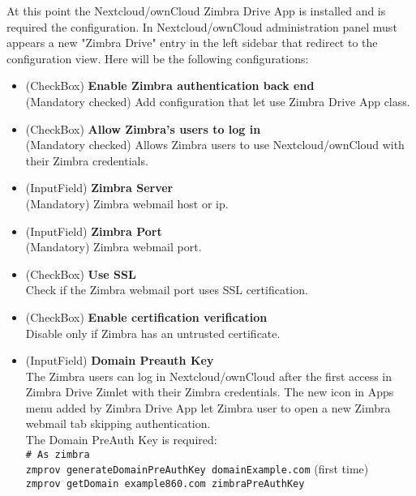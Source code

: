     At this point the Nextcloud/ownCloud Zimbra Drive App is installed and is required the configuration.
    In Nextcloud/ownCloud administration panel must appears a new "Zimbra Drive" entry in the left sidebar
    that redirect to the configuration view. Here will be the following configurations:
    \begin{itemize}
        \item (CheckBox) \textbf{Enable Zimbra authentication back end}\\
        (Mandatory checked) Add configuration that let use Zimbra Drive App class.
        \item (CheckBox) \textbf{Allow Zimbra's users to log in}\\
        (Mandatory checked) Allows Zimbra users to use Nextcloud/ownCloud with their Zimbra credentials.
        \item (InputField) \textbf{Zimbra Server}\\
        (Mandatory) Zimbra webmail host or ip.
        \item (InputField) \textbf{Zimbra Port}\\
        (Mandatory) Zimbra webmail port.
        \item (CheckBox) \textbf{Use SSL}\\
        Check if the Zimbra webmail port uses SSL certification.
        \item (CheckBox) \textbf{Enable certification verification}\\
        Disable only if Zimbra has an untrusted certificate.
        \item (InputField) \textbf{Domain Preauth Key}\\
        The Zimbra users can log in Nextcloud/ownCloud after the first access in Zimbra Drive Zimlet
        with their Zimbra credentials. The new icon in Apps menu added by Zimbra Drive App let 
        Zimbra user to open a new Zimbra webmail tab skipping authentication.\\
        The Domain PreAuth Key is required:\\
        \texttt{\# As zimbra}\\
        \texttt{zmprov generateDomainPreAuthKey domainExample.com} (first time)\\
        \texttt{zmprov getDomain example860.com zimbraPreAuthKey}
    \end{itemize}
